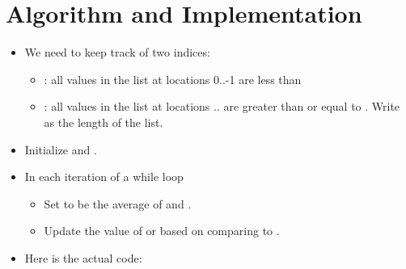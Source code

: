 \documentclass[letterpaper,10pt,english]{sphinxmanual}
\begin{document}
\section{Algorithm and Implementation}
\label{\detokenize{lecture_notes/lec20_searching:algorithm-and-implementation}}\begin{itemize}
\item {} 
We need to keep track of two indices:
\begin{itemize}
\item {} 
: all values in the list at locations 0..-1 are
less than 

\item {} 
: all values in the list at locations  ..
are greater than or equal to . Write  as the length of
the list.

\end{itemize}

\item {} 
Initialize  and .

\item {} 
In each iteration of a while loop
\begin{itemize}
\item {} 
Set  to be the average of  and .

\item {} 
Update the value of  or  based on comparing 
to .

\end{itemize}

\item {} 
Here is the actual code:

%
\begin{sphinxVerbatim}[commandchars=\\\{\}]
   
      
      
       
          
           \PYG{p}{[}\PYG{p}{]}
              
              
     
\end{sphinxVerbatim}

\end{itemize}
\end{document}

